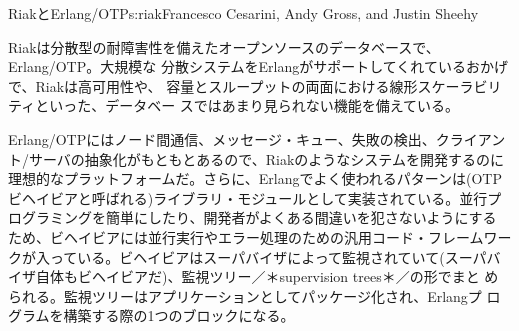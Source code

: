 \begin{aosachapter}{RiakとErlang/OTP}{s:riak}{Francesco Cesarini, Andy Gross, and Justin Sheehy}


Riakは分散型の耐障害性を備えたオープンソースのデータベースで、
Erlang/OTP。大規模な
分散システムをErlangがサポートしてくれているおかげで、Riakは高可用性や、
容量とスループットの両面における線形スケーラビリティといった、データベー
スではあまり見られない機能を備えている。


Erlang/OTPにはノード間通信、メッセージ・キュー、失敗の検出、クライアン
ト/サーバの抽象化がもともとあるので、Riakのようなシステムを開発するのに
理想的なプラットフォームだ。さらに、Erlangでよく使われるパターンは(OTP
ビヘイビアと呼ばれる)ライブラリ・モジュールとして実装されている。並行プ
ログラミングを簡単にしたり、開発者がよくある間違いを犯さないようにする
ため、ビヘイビアには並行実行やエラー処理のための汎用コード・フレームワー
クが入っている。ビヘイビアはスーパバイザによって監視されていて(スーパバ
イザ自体もビヘイビアだ)、監視ツリー／＊supervision trees＊／の形でまと
められる。監視ツリーはアプリケーションとしてパッケージ化され、Erlangプ
ログラムを構築する際の1つのブロックになる。


\end{aosachapter}
